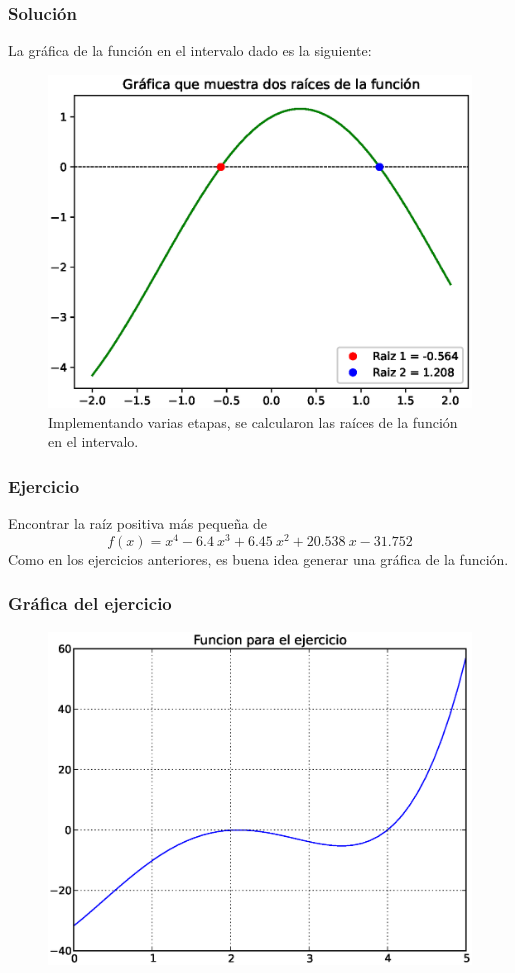 \begin{frame}
\frametitle{Solución}
La gráfica de la función en el intervalo dado es la siguiente:
\begin{figure}
	\centering
	\includegraphics[scale=0.4]{Imagenes/Ejercicio_NR_Seno_02.eps}
	\caption{Implementando varias etapas, se calcularon las raíces de la función en el  intervalo.}
\end{figure}
\end{frame}
\begin{frame}
\frametitle{Ejercicio}
Encontrar la raíz positiva más pequeña de
\[ f(x) = x^{4} - 6.4 \: x^{3} + 6.45 \: x^{2} + 20.538 \: x - 31.752\]
Como en los ejercicios anteriores, es buena idea generar una gráfica de la función.
\end{frame}
\begin{frame}
\frametitle{Gráfica del ejercicio}
\begin{figure}
	\centering
	 {\includegraphics[scale=0.5]{Imagenes/raices08.eps}}
\end{figure}
\end{frame}
